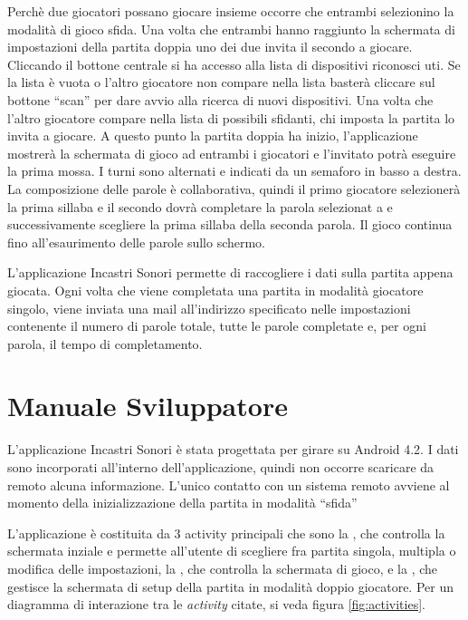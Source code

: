 Perchè due giocatori possano giocare insieme occorre che entrambi selezionino la modalità di gioco sfida. Una volta che entrambi hanno raggiunto la schermata di impostazioni della partita doppia uno dei due invita il secondo a giocare. Cliccando il bottone centrale si ha accesso alla lista di dispositivi riconosci uti. Se la lista è vuota o l'altro giocatore non compare nella lista basterà cliccare sul bottone ``scan'' per dare avvio alla ricerca di nuovi dispositivi. Una volta che l'altro giocatore compare nella lista di possibili sfidanti, chi imposta la partita lo invita a giocare. A questo punto la partita doppia ha inizio, l'applicazione mostrerà la schermata di gioco ad entrambi i giocatori e l'invitato potrà eseguire la prima mossa. I turni sono alternati e indicati da un semaforo in basso a destra. La composizione delle parole è collaborativa, quindi il primo giocatore selezionerà la prima sillaba e il secondo dovrà completare la parola selezionat a e successivamente scegliere la prima sillaba della seconda parola. Il gioco continua fino all'esaurimento delle parole sullo schermo.



L'applicazione Incastri Sonori permette di raccogliere i dati sulla partita appena giocata. Ogni volta che viene completata una partita in modalità giocatore singolo, viene inviata una mail all'indirizzo specificato nelle impostazioni contenente il numero di parole totale, tutte le parole completate e, per ogni parola, il tempo di completamento.

\section{Manuale Sviluppatore}

L'applicazione Incastri Sonori è stata progettata per girare su Android 4.2. I dati sono incorporati all'interno dell'applicazione, quindi non occorre scaricare da remoto alcuna informazione. L'unico contatto con un sistema remoto avviene al momento della inizializzazione della partita in modalità ``sfida''

L'applicazione è costituita da 3 activity principali che sono la , che controlla la schermata inziale e permette all'utente di scegliere fra partita singola, multipla o modifica delle impostazioni, la , che controlla la schermata di gioco, e la , che gestisce la schermata di setup della partita in modalità doppio giocatore. Per un diagramma di interazione tra le \emph{activity} citate, si veda figura \ref{fig:activities}.


